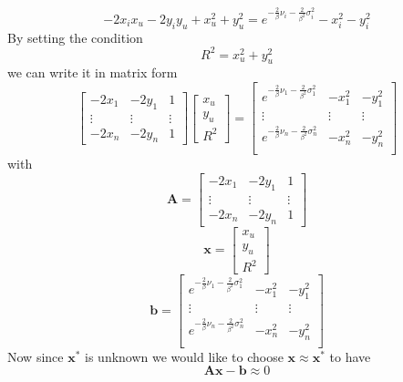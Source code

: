 \documentclass[12pt]{report}
\begin{document}
\begin{equation}
    -2x_ix_u-2y_iy_u+x_u^2+y_u^2=e^{-\frac{2}{\beta}\nu_i-\frac{2}{\beta^2}\sigma^2_i}-x_i^2-y_i^2
\end{equation}
By setting the condition 
\begin{equation}
R^2=x_u^2+y_u^2    
\label{eq:10}
\end{equation}
we can write it in matrix form
\begin{equation}
    \begin{bmatrix}
        -2x_1 & -2y_1 & 1\\
        \vdots&\vdots&\vdots\\
        -2x_n & -2y_n & 1
    \end{bmatrix}
    \begin{bmatrix}
        x_u\\
        y_u\\
        R^2
    \end{bmatrix} = 
    \begin{bmatrix}
       e^{-\frac{2}{\beta}\nu_1-\frac{2}{\beta^2}\sigma^2_1} & -x_1^2 & -y_1^2\\
        \vdots&\vdots&\vdots\\
        e^{-\frac{2}{\beta}\nu_n-\frac{2}{\beta^2}\sigma^2_n} & -x_n^2 & -y_n^2\\
    \end{bmatrix}
\end{equation}
with $$\mathbf{A}=\begin{bmatrix}
        -2x_1 & -2y_1 & 1\\
        \vdots&\vdots&\vdots\\
        -2x_n & -2y_n & 1
    \end{bmatrix}$$
$$\mathbf{x} =     \begin{bmatrix}
        x_u\\
        y_u\\
        R^2
    \end{bmatrix}$$
$$\mathbf{b}=    \begin{bmatrix}
        e^{-\frac{2}{\beta}\nu_1-\frac{2}{\beta^2}\sigma^2_1} & -x_1^2 & -y_1^2\\
        \vdots&\vdots&\vdots\\
        e^{-\frac{2}{\beta}\nu_n-\frac{2}{\beta^2}\sigma^2_n} & -x_n^2 & -y_n^2\\
    \end{bmatrix}$$
Now since $\mathbf{x^*}$ is unknown we would like to choose $\mathbf{x}\approx\mathbf{x^*}$ to have 
\begin{equation}
    \mathbf{Ax-b}\approx0
\end{equation}
\end{document}
